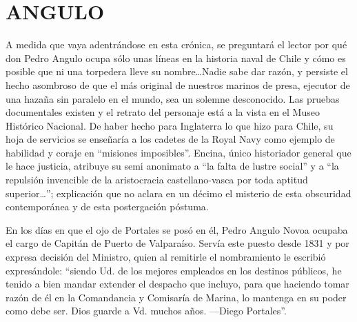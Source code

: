 \documentclass[10pt,twoside,openright]{memoir}
\begin{document}
\chapter{ANGULO}

A medida que vaya adentrándose en esta crónica, se preguntará el lector
por qué don Pedro Angulo ocupa sólo unas líneas en la historia naval de
Chile y cómo es posible que ni una torpedera lleve su nombre\ldots Nadie
sabe dar razón, y persiste el hecho asombroso de que el más original de
nuestros marinos de presa, ejecutor de una hazaña sin paralelo en el
mundo, sea un solemne desconocido. Las pruebas documentales existen y el
retrato del personaje está a la vista en el Museo Histórico Nacional. De
haber hecho para Inglaterra lo que hizo para Chile, su hoja de servicios
se enseñaría a los cadetes de la Royal Navy como ejemplo de habilidad y
coraje en ``misiones imposibles''. Encina, único historiador general que
le hace justicia, atribuye su semi anonimato a ``la falta de lustre
social'' y a ``la repulsión invencible de la aristocracia castellano-vasca
por toda aptitud superior\ldots''; explicación que no aclara en un décimo el
misterio de esta obscuridad contemporánea y de esta postergación
póstuma.

En los días en que el ojo de Portales se posó en él, Pedro Angulo Novoa
ocupaba el cargo de Capitán de Puerto de Valparaíso. Servía este puesto
desde 1831 y por expresa decisión del Ministro, quien al remitirle el
nombramiento le escribió expresándole: ``siendo Ud. de los mejores
empleados en los destinos públicos, he tenido a bien mandar extender el
despacho que incluyo, para que haciendo tomar razón de él en la
Comandancia y Comisaría de Marina, lo mantenga en su poder como debe
ser. Dios guarde a Vd. muchos años. ---Diego Portales''.
\end{document}
